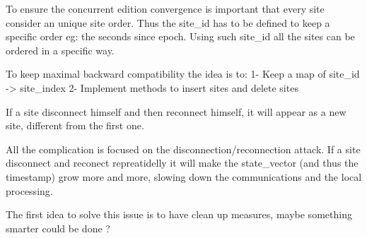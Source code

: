 \documentclass{report}
\begin{document}

To ensure the concurrent edition convergence is important that every site consider an unique site order. Thus the site_id has to be defined to keep a specific order eg: the seconds since epoch. Using such site_id all the sites can be ordered in a specific way.


To keep maximal backward compatibility the idea is to:
1- Keep a map of site_id -> site_index
2- Implement methods to insert sites and delete sites


If a site disconnect himself and then reconnect himself, it will appear as a new site, different from the first one.

All the complication is focused on the disconnection/reconnection attack. If a site disconnect and reconect repreatidelly it will make the state_vector (and thus the timestamp) grow more and more, slowing down the communications and the local processing. 

The first idea to solve this issue is to have clean up measures, maybe something smarter could be done ?




\end{document}

